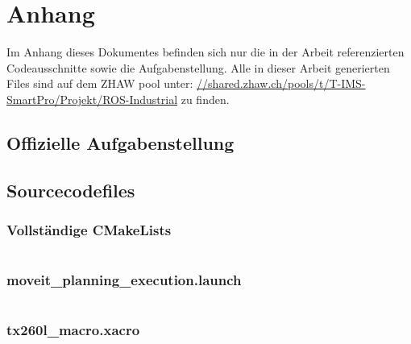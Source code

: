 
\appendix
\chapter{Anhang}
\label{sec:Anhang}
Im Anhang dieses Dokumentes befinden sich nur die in der Arbeit referenzierten Codeausschnitte sowie die Aufgabenstellung. Alle in dieser Arbeit generierten Files sind auf dem ZHAW pool unter: \url{//shared.zhaw.ch/pools/t/T-IMS-SmartPro/Projekt/ROS-Industrial} zu finden.

\section{Offizielle Aufgabenstellung}


\newpage
\section{Sourcecodefiles}
\subsection{Vollständige CMakeLists}\label{Anhang:Cmakelists}
\inputminted[bgcolor=white]{cmake}{anhang/CMakeLists.txt}

\newpage
\subsection{moveit\_planning\_execution.launch}\label{Anhang:MoveitVorlage}
\inputminted[bgcolor=white]{xml}{anhang/moveit_planning_execution.launch}

\newpage
\subsection{tx260l\_macro.xacro} \label{Anhang:Staublixacro}
\inputminted[bgcolor=white]{xml}{anhang/tx260l_macro.xacro}


